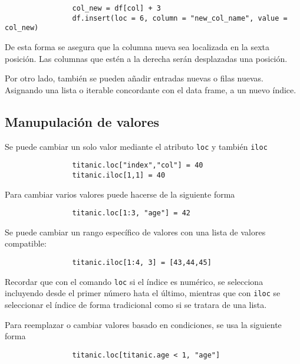             \begin{verbatim}
                col_new = df[col] + 3
                df.insert(loc = 6, column = "new_col_name", value = col_new)
            \end{verbatim}

            De esta forma se asegura que la columna nueva sea localizada en la sexta posición. Las columnas que estén a la derecha serán desplazadas una posición.

            Por otro lado, también se pueden añadir entradas nuevas o filas nuevas. Asignando una lista o iterable concordante con el data frame, a un nuevo índice.



        \subsection{Manupulación de valores}

            Se puede cambiar un solo valor mediante el atributo \texttt{loc} y también \texttt{iloc}

            \begin{verbatim}
                titanic.loc["index","col"] = 40
                titanic.iloc[1,1] = 40
            \end{verbatim}

            \noindent Para cambiar varios valores puede hacerse de la siguiente forma

            \begin{verbatim}
                titanic.loc[1:3, "age"] = 42
            \end{verbatim}

            \noindent Se puede cambiar un rango específico de valores con una lista de valores compatible:

            \begin{verbatim}
                titanic.iloc[1:4, 3] = [43,44,45]
            \end{verbatim}

            \noindent Recordar que con el comando \texttt{loc} si el índice es numérico, se selecciona incluyendo desde el primer número hata el último, mientras que con \texttt{iloc} se seleccionar el índice de forma tradicional como si se tratara de una lista.

            \noindent Para reemplazar o cambiar valores basado en condiciones, se usa la siguiente forma
            \begin{verbatim}
                titanic.loc[titanic.age < 1, "age"]
            \end{verbatim}

